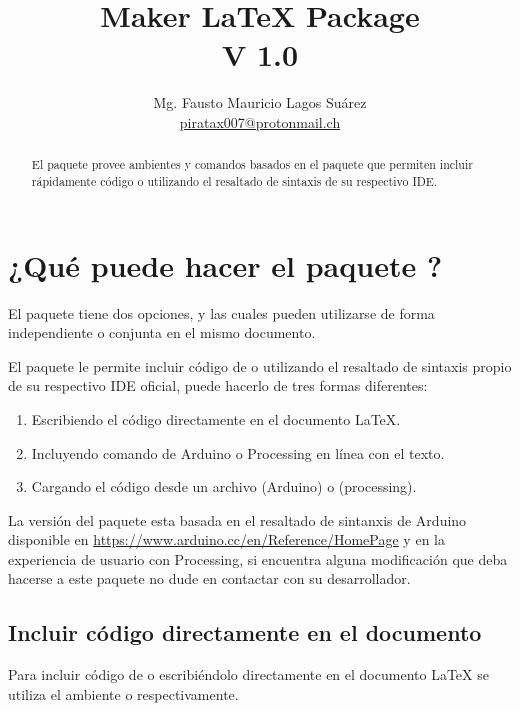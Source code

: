 \documentclass[10pt,a4paper]{article}
\author{Mg. Fausto Mauricio Lagos Suárez \\ \url{piratax007@protonmail.ch}}
\title{Maker \LaTeX{} Package \\ V 1.0}
\begin{document}
\maketitle
\renewcommand{\contentsname}{Guía del usuario}

\begin{abstract}
	El paquete  provee ambientes y comandos basados en el paquete  que permiten incluir rápidamente código  o  utilizando el resaltado de sintaxis de su respectivo IDE.
\end{abstract}

\tableofcontents

\section{¿Qué puede hacer el paquete ?}
	El paquete  tiene dos opciones,  y  las cuales pueden utilizarse de forma independiente o conjunta en el mismo documento.

	El paquete  le permite incluir código de  o  utilizando el resaltado de sintaxis propio de su respectivo IDE oficial, puede hacerlo de tres formas diferentes:
	\begin{enumerate}
		\item Escribiendo el código directamente en el documento \LaTeX{}.
		\item Incluyendo comando de Arduino o Processing en línea con el texto.
		\item Cargando el código desde un archivo  (Arduino) o  (processing).
	\end{enumerate}
	
	La versión  del paquete  esta basada en el resaltado de sintanxis de Arduino disponible en \url{https://www.arduino.cc/en/Reference/HomePage} y en la experiencia de usuario con Processing, si encuentra alguna modificación que deba hacerse a este paquete no dude en contactar con su desarrollador.
	
\subsection{Incluir código directamente en el documento}

	Para incluir código de  o  escribiéndolo directamente en el documento \LaTeX{} se utiliza el ambiente  o  respectivamente.
	
\end{document}
